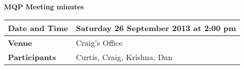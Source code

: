 \documentclass[a4wide,10pt]{extarticle}
\begin{document}
\thispagestyle{empty}

\begin{center}
\textbf{MQP Meeting minutes}
\vspace{0.33cm}
\end{center}

\begin{center}
\begin{tabular}{| m{2.8cm} | m{13.6cm} |} \hline
\textbf{Date and Time} & Saturday 26 September 2013 at 2:00 pm \\ \hline
\textbf{Venue} & Craig's Office \\ \hline
\textbf{Participants} & Curtis, Craig, Krishna, Dan\\ \hline
\end{tabular}
\end{center}
\end{document}
